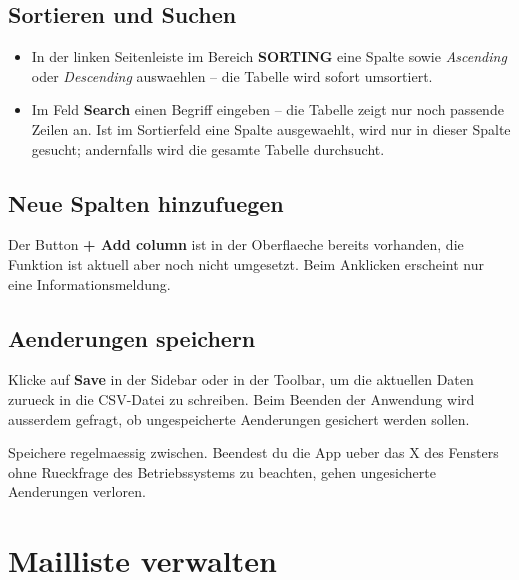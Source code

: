 \documentclass[12pt, a4paper]{article}
\begin{document}
\subsection{Sortieren und Suchen}

\begin{itemize}[leftmargin=1.5em]
    \item In der linken Seitenleiste im Bereich \textbf{SORTING} eine Spalte sowie
          \emph{Ascending} oder \emph{Descending} auswaehlen -- die Tabelle wird sofort umsortiert.
    \item Im Feld \textbf{Search} einen Begriff eingeben -- die Tabelle zeigt nur noch
          passende Zeilen an. Ist im Sortierfeld eine Spalte ausgewaehlt, wird nur in
          dieser Spalte gesucht; andernfalls wird die gesamte Tabelle durchsucht.
\end{itemize}

\subsection{Neue Spalten hinzufuegen}

\begin{warnbox}
Der Button \textbf{+ Add column} ist in der Oberflaeche bereits vorhanden, die
Funktion ist aktuell aber noch nicht umgesetzt. Beim Anklicken erscheint nur
eine Informationsmeldung.
\end{warnbox}

\subsection{Aenderungen speichern}

Klicke auf \textbf{Save} in der Sidebar oder in der Toolbar, um die aktuellen
Daten zurueck in die CSV-Datei zu schreiben. Beim Beenden der Anwendung wird
ausserdem gefragt, ob ungespeicherte Aenderungen gesichert werden sollen.

\begin{warnbox}
Speichere regelmaessig zwischen. Beendest du die App ueber das X des Fensters
ohne Rueckfrage des Betriebssystems zu beachten, gehen ungesicherte Aenderungen
verloren.
\end{warnbox}

\section{Mailliste verwalten}
\end{document}
